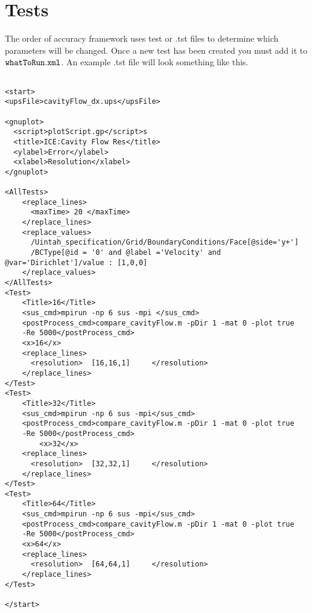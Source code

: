 \section{Tests}

The order of accuracy framework uses test or .tst files to determine which parameters will be changed. Once a new test has been created you must add it to $\tt{whatToRun.xml} \normalfont$. An example .tst file will look something like this.

\begin{verbatim}

<start>
<upsFile>cavityFlow_dx.ups</upsFile>

<gnuplot>
  <script>plotScript.gp</script>s
  <title>ICE:Cavity Flow Res</title>
  <ylabel>Error</ylabel>
  <xlabel>Resolution</xlabel>
</gnuplot>

<AllTests>
    <replace_lines>
      <maxTime> 20 </maxTime>
    </replace_lines>
    <replace_values>
      /Uintah_specification/Grid/BoundaryConditions/Face[@side='y+']
      /BCType[@id = '0' and @label ='Velocity' and @var='Dirichlet']/value : [1,0,0]
    </replace_values>
</AllTests>
<Test>
    <Title>16</Title>
    <sus_cmd>mpirun -np 6 sus -mpi </sus_cmd>
    <postProcess_cmd>compare_cavityFlow.m -pDir 1 -mat 0 -plot true
    -Re 5000</postProcess_cmd>
    <x>16</x>
    <replace_lines>
      <resolution>  [16,16,1]     </resolution>
    </replace_lines>
</Test>
<Test>
    <Title>32</Title>
    <sus_cmd>mpirun -np 6 sus -mpi</sus_cmd>
    <postProcess_cmd>compare_cavityFlow.m -pDir 1 -mat 0 -plot true
    -Re 5000</postProcess_cmd>
        <x>32</x>
    <replace_lines>
      <resolution>  [32,32,1]     </resolution>
    </replace_lines>
</Test>
<Test>
    <Title>64</Title>
    <sus_cmd>mpirun -np 6 sus -mpi</sus_cmd>
    <postProcess_cmd>compare_cavityFlow.m -pDir 1 -mat 0 -plot true
    -Re 5000</postProcess_cmd>
    <x>64</x>
    <replace_lines>
      <resolution>  [64,64,1]     </resolution>
    </replace_lines>
</Test>

</start>

\end{verbatim}

